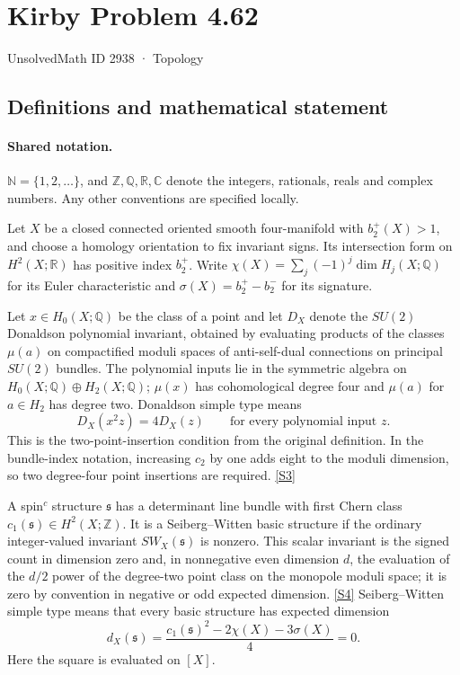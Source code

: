 \documentclass[11pt]{article}
\newcommand{\sref}[2]{\hyperlink{source:#1:#2}{[S#2]}}
\begin{document}
\setcounter{section}{2937}
\section{Kirby Problem 4.62}\label{2938}
{\small\sffamily UnsolvedMath ID 2938 · Topology}
\subsection{Definitions and mathematical statement}

\paragraph{Shared notation.}$\mathbb N=\{1,2,\ldots\}$, and $\mathbb Z,\mathbb Q,\mathbb R,\mathbb C$ denote the integers, rationals, reals and complex numbers. Any other conventions are specified locally.


Let $X$ be a closed connected oriented smooth four-manifold with $b_2^+(X)>1$, and choose a homology orientation to fix invariant signs. Its intersection form on $H^2(X;\mathbb R)$ has positive index $b_2^+$. Write $\chi(X)=\sum_j(-1)^j\dim H_j(X;\mathbb Q)$ for its Euler characteristic and $\sigma(X)=b_2^+-b_2^-$ for its signature.

Let $x\in H_0(X;\mathbb Q)$ be the class of a point and let $D_X$ denote the $SU(2)$ Donaldson polynomial invariant, obtained by evaluating products of the classes $\mu(a)$ on compactified moduli spaces of anti-self-dual connections on principal $SU(2)$ bundles. The polynomial inputs lie in the symmetric algebra on $H_0(X;\mathbb Q)\oplus H_2(X;\mathbb Q)$; $\mu(x)$ has cohomological degree four and $\mu(a)$ for $a\in H_2$ has degree two. Donaldson simple type means
\[
D_X(x^2z)=4D_X(z)\qquad\text{for every polynomial input }z.
\]
This is the two-point-insertion condition from the original definition. In the bundle-index notation, increasing $c_2$ by one adds eight to the moduli dimension, so two degree-four point insertions are required. \sref{2938}{3}

A spin$^c$ structure $\mathfrak s$ has a determinant line bundle with first Chern class $c_1(\mathfrak s)\in H^2(X;\mathbb Z)$. It is a Seiberg--Witten basic structure if the ordinary integer-valued invariant $SW_X(\mathfrak s)$ is nonzero. This scalar invariant is the signed count in dimension zero and, in nonnegative even dimension $d$, the evaluation of the $d/2$ power of the degree-two point class on the monopole moduli space; it is zero by convention in negative or odd expected dimension. \sref{2938}{4} Seiberg--Witten simple type means that every basic structure has expected dimension
\[
d_X(\mathfrak s)=\frac{c_1(\mathfrak s)^2-2\chi(X)-3\sigma(X)}4=0.
\]
Here the square is evaluated on $[X]$.
\end{document}
